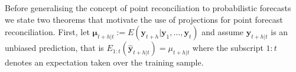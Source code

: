 \documentclass[a4paper, 11pt]{article}
\theoremstyle{theo}
\theoremstyle{definition}
\begin{document}



%
%

Before generalising the concept of point reconciliation to probabilistic forecasts we state two theorems that motivate the use of projections for point forecast reconciliation.  First, let ${\bm \mu}_{t+h|t}:=E({\bm y}_{t+h}|{\bm y}_{1},\dots,{\bm y}_{t})$ and assume $\hat{\bm y}_{t+h|t}$ is an unbiased prediction, that is $E_{1:t}\left(\hat{\bm y}_{t+h|t}\right)=\mu_{t+h|t}$ where the subscript $1:t$ denotes an expectation taken over the training sample.
\end{document}
